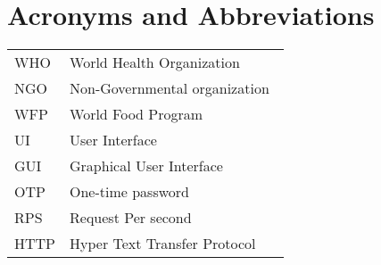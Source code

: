 \chapter*{Acronyms and Abbreviations}

\begin{flushleft}
\begin{tabular}{l p{0.8\linewidth}}
WHO & World Health Organization\\
NGO & Non-Governmental organization\\
WFP &  World Food Program\\
UI & User Interface\\
GUI & Graphical User Interface\\
OTP & One-time password\\
RPS & Request Per second\\
HTTP & Hyper Text Transfer Protocol\\ 

\end{tabular}
\end{flushleft}

